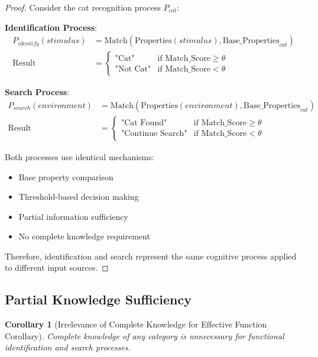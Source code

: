 \documentclass[12pt,a4paper]{article}
\newtheorem{corollary}[theorem]{Corollary}
\begin{document}
\begin{proof}
Consider the cat recognition process $P_{cat}$:

\textbf{Identification Process}:
\begin{align}
P_{identify}(stimulus) &= \text{Match}(\text{Properties}(stimulus), \text{Base\_Properties}_{cat}) \\
\text{Result} &= \begin{cases} 
\text{"Cat"} & \text{if Match\_Score} \geq \theta \\
\text{"Not Cat"} & \text{if Match\_Score} < \theta
\end{cases}
\end{align}

\textbf{Search Process}:
\begin{align}
P_{search}(environment) &= \text{Match}(\text{Properties}(environment), \text{Base\_Properties}_{cat}) \\
\text{Result} &= \begin{cases} 
\text{"Cat Found"} & \text{if Match\_Score} \geq \theta \\
\text{"Continue Search"} & \text{if Match\_Score} < \theta
\end{cases}
\end{align}

Both processes use identical mechanisms:
\begin{itemize}
\item Base property comparison
\item Threshold-based decision making
\item Partial information sufficiency
\item No complete knowledge requirement
\end{itemize}

Therefore, identification and search represent the same cognitive process applied to different input sources.
\end{proof}

\subsection{Partial Knowledge Sufficiency}

\begin{corollary}[Irrelevance of Complete Knowledge for Effective Function Corollary]
Complete knowledge of any category is unnecessary for functional identification and search processes.
\end{corollary}
\end{document}
